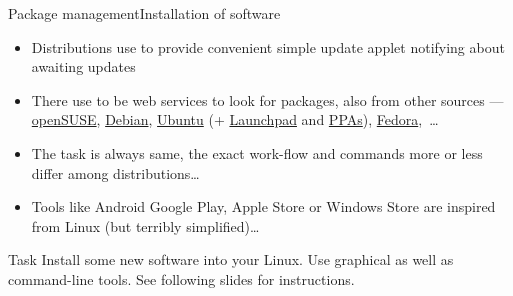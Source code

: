 \documentclass[compress, ucs, xelatex, 11pt, xcolor=svgnames, aspectratio=169,
	hyperref={
		bookmarks=true,
		unicode=true,
		colorlinks=true,
		pdftitle={Linux, command line and MetaCentrum},
		plainpages=false,
		pdfauthor={Vojtech Zeisek},
		pdfsubject={Course about use of Linux command line, writing shell scripts and using MetaCentrum of CESNET},
		pdfcreator={XeLaTeX},
		pdfkeywords={Linux, GNU, BASH, shell, command line, MetaCentrum},
		linkcolor=DarkRed, %
		anchorcolor=DarkBlue, %
		citecolor=Indigo, %
		filecolor=NavyBlue, %
		menucolor=DarkMagenta, %
		urlcolor=DarkBlue, %
		pdftex},
	url={hyphens, lowtilde} %
	]{beamer}
\begin{document}
\begin{frame}[allowframebreaks]{Package management}{Installation of software}
\begin{itemize}
		\begin{itemize}
			\item Ubuntu Software Center
			\item Synaptic --- feature rich, graphical, advances, for any DEB distribution (Debian, Ubuntu, Mint,~\ldots)
			\item Aptitude --- feature rich, command-line, advanced, for any DEB distribution (more advanced version of Apt)
			\item DPKG --- low-level, any DEB-based distribution
			\item YaST Software for openSUSE (feature rich, graphical as well as command-line)
			\item Zypper --- feature rich, command-line, advanced, for openSUSE
			\item DNF --- feature rich, command-line, advanced, for Fedora and another RPM based distributions (replacing older Yum)
			\item RPM --- low level, any RPM-based distribution
			\item GNOME software --- in most of distributions using GNOME
			\item And many more\ldots
			\item All do same task --- as soon as user master one, others are equally simple
		\end{itemize}
		\item Distributions use to provide convenient simple update applet notifying about awaiting updates
		\item There use to be web services to look for packages, also from other sources --- \href{https://software.opensuse.org/explore}{openSUSE}, \href{https://www.debian.org/distrib/packages\#search_packages}{Debian}, \href{https://packages.ubuntu.com/}{Ubuntu} (+ \href{https://launchpad.net/ubuntu/+search}{Launchpad} and \href{https://launchpad.net/ubuntu/+ppas}{PPAs}), \href{https://packages.fedoraproject.org/}{Fedora},~\ldots
		\item The task is always same, the exact work-flow and commands more or less differ among distributions\ldots
		\item Tools like Android Google Play, Apple Store or Windows Store are inspired from Linux (but terribly simplified)\ldots
	\end{itemize}
	\vfill
	\begin{block}{Task}
		Install some new software into your Linux. Use graphical as well as command-line tools. See following slides for instructions.
	\end{block}
\end{frame}
\end{document}
